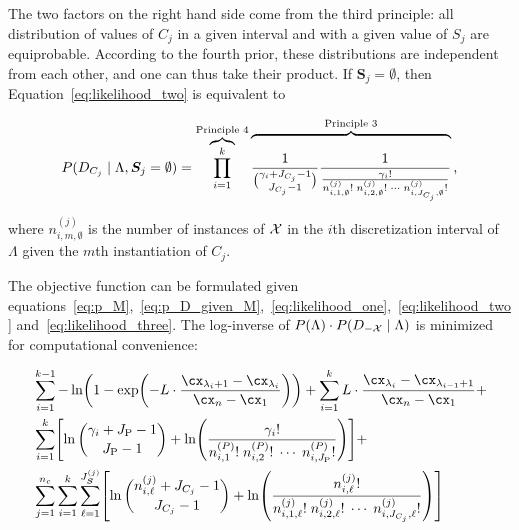 The two factors on the right hand side come from the third principle: all distribution of values of $C_j$ in a given interval and with a given value of $S_j$ are equiprobable.
According to the fourth prior, these distributions are independent from each other, and one can thus take their product.
If $\bm{S}_j = \emptyset$, then Equation~\ref{eq:likelihood_two} is equivalent to

\begin{equation}
  \label{eq:likelihood_three}
  P(D_{C_j} \mid \Lambda, \bm{S}_j = \emptyset) =
  \overbrace{\prod_{i=1}^{k}}^{\text{Principle 4}}
  \overbrace{\rule{0pt}{2.3em}{
    {1}\over{
      {\gamma_i + J_{C_j} - 1}\choose{J_{C_j}-1}}
    }
    {{1}\over{
      {{\gamma_i}!} \over {
        {n^{(j)}_{i,1,\emptyset}!} \; {n^{(j)}_{i,2,\emptyset}!} \; \cdots \; {n^{(j)}_{i,J_{C_j},\emptyset} !}
      }
    }
  }}^{\text{Principle 3}}
  \text{,}
\end{equation}

\noindent
where $n^{(j)}_{i,m,\emptyset}$ is the number of instances of $\mathcal{X}$ in the $i$th discretization interval of $\Lambda$ given the $m$th instantiation of $C_j$.

The objective function can be formulated given equations~\ref{eq:p_M},~\ref{eq:p_D_given_M},~\ref{eq:likelihood_one},~\ref{eq:likelihood_two} and~\ref{eq:likelihood_three}.
The log-inverse of $P(\Lambda) \cdot P(D_{-\mathcal{X}} \mid \Lambda)$ is minimized for computational convenience:

\begin{equation}
\label{eq:opt_prob}
\begin{aligned}
  & \sum_{i=1}^{k-1}
   - \ln
    \paren{
      1 - \exp
      \paren{
        - L \cdot  \frac{
                         \cx_{\lambda_i +1} - \cx_{\lambda_i}
                       }{
                         \cx_n - \cx_1
                        }
      }
    }
      + \sum_{i=1}^{k}
      L \cdot \frac{\cx_{\lambda_{i}} - \cx_{\lambda_{i-1} + 1}}{\cx_n - \cx_1} + \\
  & \sum_{i=1}^{k} \brock{
  \ln{{\gamma_i + J_\text{P} - 1}\choose{J_\text{P} - 1}}
  +{ \ln \paren{
        \frac{
          {\gamma_i}!
        }{
          {n^{({P})}_{i,1}}! \; {n^{({P})}_{i,2}}! \; \cdots \; {n^{({P})}_{i,J_\text{P}}}!
        }
      }}
  } + \\
  & \sum_{j=1}^{n_c} \sum_{i=1}^k \sum_{\ell=1}^{J^{(j)}_{\bm{S}}} \brock{
  { \ln
          {{n^{(j)}_{i,\ell} + J_{C_j} - 1}\choose{J_{C_j}-1}}}
    +
    \ln \paren{ {
          \frac{
            {n^{(j)}_{i,\ell}}!
          }{
            {n^{(j)}_{i,1,\ell}!} \; {n^{(j)}_{i,2,\ell}!} \; \cdots \; {n^{(j)}_{i,J_{C_j},\ell}!}
          }
        }
        } }
\end{aligned}
\end{equation}

